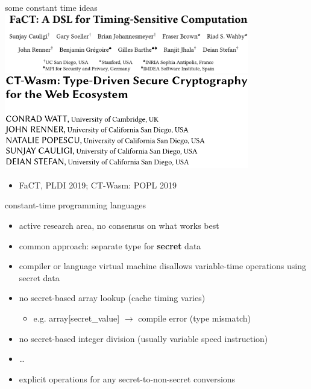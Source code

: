 \begin{frame}{some constant time ideas}
\includegraphics[width=0.8\textwidth]{../betterpl/fact-title}
\includegraphics[width=0.8\textwidth]{../betterpl/ct-wasm-title}
\begin{itemize}
\item FaCT, PLDI 2019; CT-Wasm: POPL 2019
\end{itemize}
\end{frame}

\begin{frame}{constant-time programming languages}
    \begin{itemize}
    \item active research area, no consensus on what works best
    \vspace{.5cm}
    \item common approach: separate type for \textbf{secret} data
    \item compiler or language virtual machine disallows variable-time operations using secret data
    \item no secret-based array lookup (cache timing varies)
        \begin{itemize}
        \item e.g. array[secret\_value] $\rightarrow$ compile error (type mismatch)
        \end{itemize}
    \item no secret-based integer division (usually variable speed instruction)
    \item \ldots
    \vspace{.5cm}
    \item explicit operations for any secret-to-non-secret conversions
    \end{itemize}
\end{frame}
